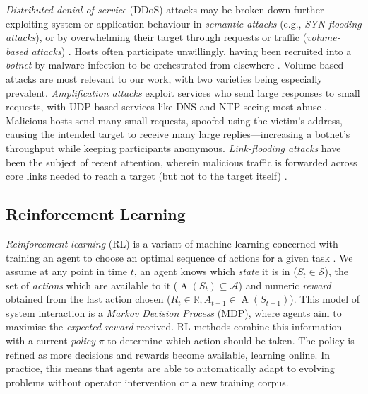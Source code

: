 \documentclass[10pt, times, conference, letterpaper]{IEEEtran}
\begin{document}

\emph{Distributed denial of service} (DDoS) attacks may be broken down further---exploiting system or application behaviour in \emph{semantic attacks} (e.g., \emph{SYN flooding attacks}), or by overwhelming their target through requests or traffic (\emph{volume-based attacks}) \cite{DBLP:conf/imc/JonkerKKRSD17}.
Hosts often participate unwillingly, having been recruited into a \emph{botnet} by malware infection to be orchestrated from elsewhere \cite{DBLP:conf/uss/AntonakakisABBB17}.
Volume-based attacks are most relevant to our work, with two varieties being especially prevalent.
\emph{Amplification attacks} exploit services who send large responses to small requests, with UDP-based services like DNS and NTP seeing most abuse \cite{DBLP:conf/ndss/Rossow14, DBLP:conf/uss/KuhrerHRH14}.
Malicious hosts send many small requests, spoofed using the victim's address, causing the intended target to receive many large replies---increasing a botnet's throughput while keeping participants anonymous.
\emph{Link-flooding attacks} have been the subject of recent attention, wherein malicious traffic is forwarded across core links needed to reach a target (but not to the target itself) \cite{DBLP:conf/sp/KangLG13, DBLP:conf/esorics/StuderP09}.

\subsection{Reinforcement Learning}\label{sec:reinforcement-learning}
\emph{Reinforcement learning} (RL) is a variant of machine learning concerned with training an agent to choose an optimal sequence of actions for a given task \cite{RL2E}.
We assume at any point in time $t$, an agent knows which \emph{state} it is in ($S_t \in \mathcal{S}$), the set of \emph{actions} which are available to it ($\operatorname{A}(S_t) \subseteq \mathcal{A}$) and numeric \emph{reward} obtained from the last action chosen ($R_t \in \mathbb{R}, A_{t-1} \in \operatorname{A}(S_{t-1})$).
This model of system interaction is a \emph{Markov Decision Process} (MDP), where agents aim to maximise the \emph{expected reward} received.
RL methods combine this information with a current \emph{policy} $\pi$ to determine which action should be taken.
The policy is refined as more decisions and rewards become available, learning online.
In practice, this means that agents are able to automatically adapt to evolving problems without operator intervention or a new training corpus.
\end{document}
